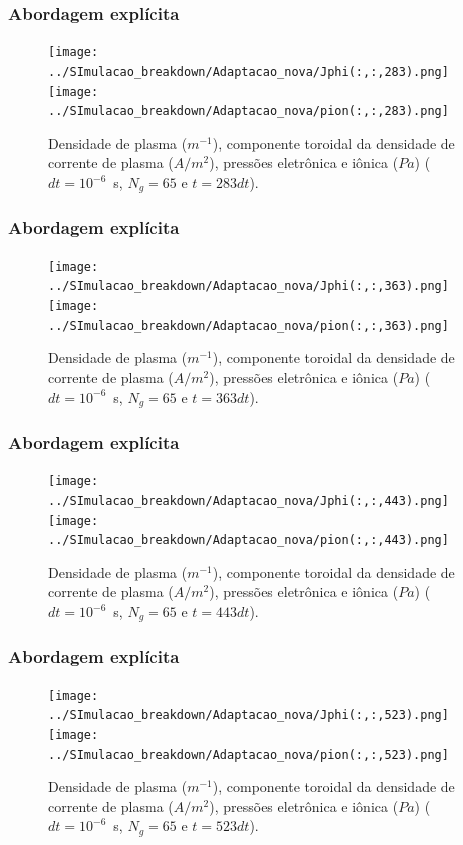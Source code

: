 \documentclass[aspectratio=169]{beamer}
\begin{document}
	\begin{frame}
		\frametitle{Abordagem explícita}


\begin{figure}[H]
\begin{center}
\texttt{[image: ../SImulacao\_breakdown/Adaptacao\_nova/Jphi(:,:,283).png]}  
\texttt{[image: ../SImulacao\_breakdown/Adaptacao\_nova/pion(:,:,283).png]}  
\caption{Densidade de plasma ($m^{-1}$), componente toroidal da densidade de corrente de plasma ($A/m^2$), pressões eletrônica e iônica ($Pa$) ($dt=10^{-6}$\ s, $N_g = 65$ e $t=283dt$).}
\end{center}
\end{figure}
	\end{frame}
	\begin{frame}
		\frametitle{Abordagem explícita}


\begin{figure}[H]
\label{simul15}
\begin{center}
\texttt{[image: ../SImulacao\_breakdown/Adaptacao\_nova/Jphi(:,:,363).png]} 
\texttt{[image: ../SImulacao\_breakdown/Adaptacao\_nova/pion(:,:,363).png]}  
\caption{Densidade de plasma ($m^{-1}$), componente toroidal da densidade de corrente de plasma ($A/m^2$), pressões eletrônica e iônica ($Pa$) ($dt=10^{-6}$\ s, $N_g = 65$ e $t=363dt$).}
\end{center}
\end{figure}
	\end{frame}
	\begin{frame}
		\frametitle{Abordagem explícita}


\begin{figure}[H]
\label{simul19}
\begin{center}
\texttt{[image: ../SImulacao\_breakdown/Adaptacao\_nova/Jphi(:,:,443).png]}  
\texttt{[image: ../SImulacao\_breakdown/Adaptacao\_nova/pion(:,:,443).png]}  
\caption{Densidade de plasma ($m^{-1}$), componente toroidal da densidade de corrente de plasma ($A/m^2$), pressões eletrônica e iônica ($Pa$) ($dt=10^{-6}$\ s, $N_g = 65$ e $t=443dt$).}
\end{center}
\end{figure}
	\end{frame}
	\begin{frame}
		\frametitle{Abordagem explícita}


\begin{figure}[H]
\label{simul23}
\begin{center}
\texttt{[image: ../SImulacao\_breakdown/Adaptacao\_nova/Jphi(:,:,523).png]} 
\texttt{[image: ../SImulacao\_breakdown/Adaptacao\_nova/pion(:,:,523).png]}  
\caption{Densidade de plasma ($m^{-1}$), componente toroidal da densidade de corrente de plasma ($A/m^2$), pressões eletrônica e iônica ($Pa$) ($dt=10^{-6}$\ s, $N_g = 65$ e $t=523dt$).}
\end{center}
\end{figure}
	\end{frame}
\end{document}
